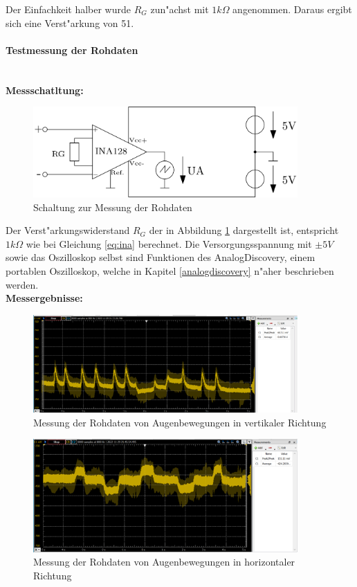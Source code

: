 Der Einfachkeit halber wurde $R_G$ zun"achst mit $1k\Omega$ angenommen. Daraus ergibt sich eine Verst"arkung von 51.

\paragraph {Testmessung der Rohdaten} \label {Rohdaten}
\textbf{\\Messschatltung:}
\begin{figure}[H]
	\centering
		\includegraphics[width=0.9\textwidth]{Fuchs/Messschaltung-Rohdaten.png}
	\caption{Schaltung zur Messung der Rohdaten}
	\label{fig:ms_rohdaten}
\end{figure}

Der Verst"arkungswiderstand $R_G$ der in Abbildung \ref{fig:ms_rohdaten} dargestellt ist, entspricht $1k\Omega$ wie bei Gleichung \ref{eq:ina} berechnet. Die Versorgungsspannung mit $\pm5V$ sowie das Oszilloskop selbst sind Funktionen des AnalogDiscovery, einem portablen Oszilloskop, welche in Kapitel \ref{analogdiscovery} n"aher beschrieben werden. \\

\textbf{Messergebnisse:}
\begin{figure}[H]
	\centering
		\includegraphics[width=0.9\textwidth]{Fuchs/Messergebnis_RohdatenV.png}
	\caption{Messung der Rohdaten von Augenbewegungen in vertikaler Richtung}
	\label{fig:me_rohdatenV}
\end{figure}
\begin{figure}[H]
	\centering
		\includegraphics[width=0.9\textwidth]{Fuchs/Messergebnis_RohdatenH.png}
	\caption{Messung der Rohdaten von Augenbewegungen in horizontaler Richtung}
	\label{fig:me_rohdatenH}
\end{figure}


